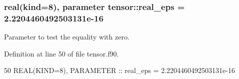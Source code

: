 \subsubsection[{\texorpdfstring{real\+\_\+eps}{real_eps}}]{\setlength{\rightskip}{0pt plus 5cm}real(kind=8), parameter tensor\+::real\+\_\+eps = 2.\+2204460492503131e-\/16}\hypertarget{namespacetensor_a2a2ab182d86107e62533c3f0043652cc}{}\label{namespacetensor_a2a2ab182d86107e62533c3f0043652cc}


Parameter to test the equality with zero. 



Definition at line 50 of file tensor.\+f90.


\begin{DoxyCode}
50   \textcolor{keywordtype}{REAL(KIND=8)}, \textcolor{keywordtype}{PARAMETER} :: real\_eps = 2.2204460492503131e-16
\end{DoxyCode}
